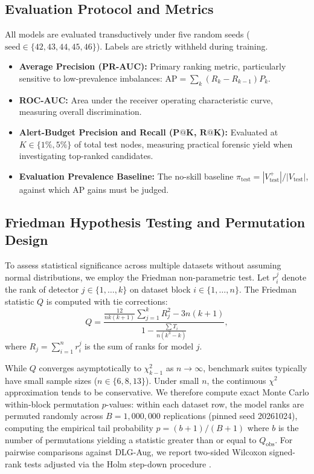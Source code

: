 \documentclass[applsci,article,submit,moreauthors,pdftex]{Definitions/mdpi}
\begin{document}
\subsection{Evaluation Protocol and Metrics}
All models are evaluated transductively under five random seeds ($\text{seed} \in \{42, 43, 44, 45, 46\}$). Labels are strictly withheld during training.
\begin{itemize}
    \item \textbf{Average Precision (PR-AUC):} Primary ranking metric, particularly sensitive to low-prevalence imbalances: $\mathrm{AP} = \sum_k (R_k - R_{k-1}) P_k$.
    \item \textbf{ROC-AUC:} Area under the receiver operating characteristic curve, measuring overall discrimination.
    \item \textbf{Alert-Budget Precision and Recall ($\mathbf{P@K}$, $\mathbf{R@K}$):} Evaluated at $K \in \{1\%, 5\%\}$ of total test nodes, measuring practical forensic yield when investigating top-ranked candidates.
    \item \textbf{Evaluation Prevalence Baseline:} The no-skill baseline $\pi_{\mathrm{test}} = |V_{\mathrm{test}}^+| / |V_{\mathrm{test}}|$, against which AP gains must be judged.
\end{itemize}

\subsection{Friedman Hypothesis Testing and Permutation Design}
To assess statistical significance across multiple datasets without assuming normal distributions, we employ the Friedman non-parametric test. Let $r_i^j$ denote the rank of detector $j \in \{1, \dots, k\}$ on dataset block $i \in \{1, \dots, n\}$. The Friedman statistic $Q$ is computed with tie corrections:
\begin{equation}
Q = \frac{\frac{12}{n k (k+1)} \sum_{j=1}^k R_j^2 - 3 n (k+1)}{1 - \frac{\sum T_i}{n(k^3 - k)}},
\label{eq:friedman_q}
\end{equation}
where $R_j = \sum_{i=1}^n r_i^j$ is the sum of ranks for model $j$. 

While $Q$ converges asymptotically to $\chi^2_{k-1}$ as $n \to \infty$, benchmark suites typically have small sample sizes ($n \in \{6, 8, 13\}$). Under small $n$, the continuous $\chi^2$ approximation tends to be conservative. We therefore compute exact Monte Carlo within-block permutation $p$-values: within each dataset row, the model ranks are permuted randomly across $B=1,000,000$ replications (pinned seed 20261024), computing the empirical tail probability $p = (b + 1) / (B + 1)$ where $b$ is the number of permutations yielding a statistic greater than or equal to $Q_{\mathrm{obs}}$. For pairwise comparisons against DLG-Aug, we report two-sided Wilcoxon signed-rank tests adjusted via the Holm step-down procedure \cite{holm1979}.
\end{document}

